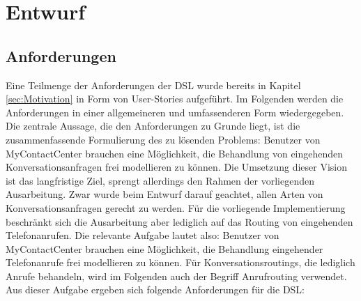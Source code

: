 \chapter{Entwurf}
\label{chap:Entwurf}

\section{Anforderungen}
Eine Teilmenge der Anforderungen der DSL wurde bereits in Kapitel \ref{sec:Motivation} in Form von User-Stories aufgeführt. Im Folgenden werden die Anforderungen in einer allgemeineren und umfassenderen Form wiedergegeben. Die zentrale Aussage, die den Anforderungen zu Grunde liegt, ist die zusammenfassende Formulierung des zu lösenden Problems: Benutzer von MyContactCenter brauchen eine Möglichkeit, die Behandlung von eingehenden Konversationsanfragen frei modellieren zu können. Die Umsetzung dieser Vision ist das langfristige Ziel, sprengt allerdings den Rahmen der vorliegenden Ausarbeitung. Zwar wurde beim Entwurf darauf geachtet, allen Arten von Konversationsanfragen gerecht zu werden. Für die vorliegende Implementierung beschränkt sich die Ausarbeitung aber lediglich auf das Routing von eingehenden Telefonanrufen. Die relevante Aufgabe lautet also: Benutzer von MyContactCenter brauchen eine Möglichkeit, die Behandlung eingehender Telefonanrufe frei modellieren zu können. Für Konversationsroutings, die lediglich Anrufe behandeln, wird im Folgenden auch der Begriff Anrufrouting verwendet.
\newline
Aus dieser Aufgabe ergeben sich folgende Anforderungen für die DSL:
